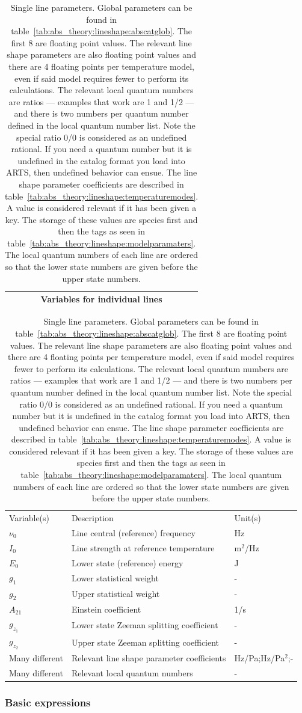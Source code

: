 \begin{table}[ht]
\centering
 \begin{tabular}{c}
  Variables for individual lines\\\hline
 \end{tabular}
\begin{tabular}{lll}
Variable(s)&Description&Unit(s)\\
 $\nu_0$&Line central (reference) frequency&Hz\\
 $I_0$&Line strength at reference temperature&m$^2$/Hz\\
 $E_0$&Lower state (reference) energy&J\\
 $g_1$&Lower statistical weight&-\\
 $g_2$&Upper statistical weight&-\\
 $A_{21}$&Einstein coefficient&1/s\\
 $g_{z_1}$&Lower state Zeeman splitting coefficient&-\\
 $g_{z_2}$&Upper state Zeeman splitting coefficient&-\\
 Many different&Relevant line shape parameter coefficients&Hz/Pa;Hz/Pa$^2$;-\\
 Many different&Relevant local quantum numbers&-
\end{tabular}
\caption{Single line parameters.  Global parameters can be found in table~\ref{tab:abs_theory:lineshape:abscatglob}.
The first 8 are floating point values.
The relevant line shape parameters are also floating point values and there are
4 floating points per temperature model, even if said model requires fewer
to perform its calculations.
The relevant local quantum numbers are ratios --- examples that work are 1 and 1/2 --- and there is two numbers per quantum number defined in the local quantum number list.  Note the 
special ratio 0/0 is considered as an undefined rational.
If you need a quantum number but
it is undefined in the catalog format you load into ARTS,
then undefined behavior can ensue.
The line shape parameter coefficients are described in table~\ref{tab:abs_theory:lineshape:temperaturemodes}.
A value is considered relevant if it has been given a key.  The storage of these
values are species first and then the tags as seen in table~\ref{tab:abs_theory:lineshape:modelparamaters}.
The local quantum numbers of each line are ordered so that the lower state numbers
are given before the upper state numbers.
}
\label{tab:abs_theory:lineshape:abscatline}
\end{table}

\subsubsection{Basic expressions}

